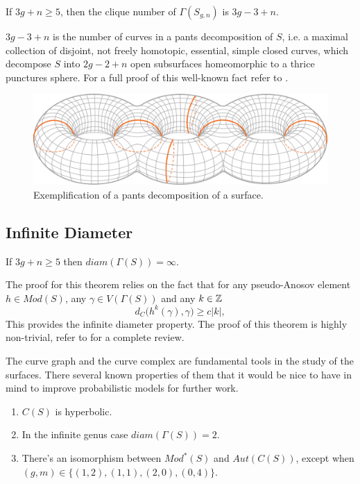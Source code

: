 \begin{theorem}
If $3g+n\geq 5$, then the clique number of $\Gamma(S_{g,n})$ is $3g - 3 + n$.
\end{theorem}

$3g-3+n$ is the number of curves in a pants decomposition of $S$, i.e. a maximal collection of disjoint, not freely homotopic, essential, simple closed curves, which decompose $S$ into $2g-2+n$ open subsurfaces homeomorphic to a thrice punctures sphere. For a full proof of this well-known fact refer to \cite[Hatcher, Thurston 80]{Pants}.

\vspace{0.5cm}
\begin{figure}[h!]
	\centering
	\includegraphics[scale=0.4]{Figures/Pantalones.png}
	\caption{Exemplification of a pants decomposition of a surface.}
\end{figure}

\subsection{Infinite Diameter}
\begin{theorem}
If $3g+n\geq 5$ then $diam(\Gamma(S)) = \infty$.
\end{theorem}

The proof for this theorem relies on the fact that for any pseudo-Anosov element $h \in Mod(S)$, any $\gamma \in V(\Gamma(S))$ and any $k\in \mathbb{Z}$
$$d_{C}\Big(h^{k}(\gamma), \gamma\Big) \geq c|k|,$$
This provides the infinite diameter property. The proof of this theorem is highly non-trivial, refer to \cite[Masur, Minsky 99]{Masur} for a complete review.

The curve graph and the curve complex are fundamental tools in the study of the surfaces. There several known properties of them that it would be nice to have in mind to improve probabilistic models for further work.

\begin{enumerate}
\item $C(S)$ is hyperbolic.
\item In the infinite genus case $diam(\Gamma(S))= 2$.
\item There's an isomorphism between $Mod^{\ast}(S)$ and $Aut(C(S))$, except when $(g,m) \in \{(1,2), (1,1), (2,0), (0,4)\}$.
\end{enumerate}

